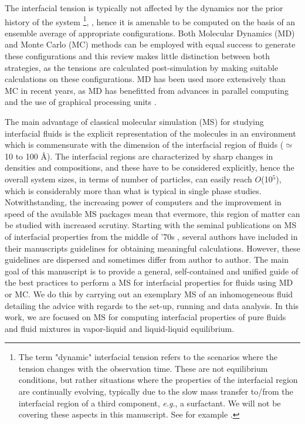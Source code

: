 \documentclass[9pt,bestpractices]{livecoms}
\begin{document}
The interfacial tension is typically not affected by the dynamics nor the prior
history of the system \footnote{The term "dynamic" interfacial tension
refers to the scenarios where the tension changes with the observation time.
These are not equilibrium conditions, but rather situations where the
properties of the interfacial region are continually evolving, typically due to
the slow mass transfer to/from the interfacial region of a third component,
\textit{e.g}., a surfactant. We will not be covering these aspects in this
manuscript. See for example \citet{dukhin1995}.}, \citep{rowlinson1982}, hence it is amenable to be computed on
the basis of an ensemble average of appropriate configurations. Both Molecular
Dynamics (MD) \citep{allen2017} and Monte Carlo (MC) \citep{frenkel2002} methods can be employed
with equal success to generate these configurations and this review makes
little distinction between both strategies, as the tensions are calculated
post-simulation by making suitable calculations on these configurations. MD has
been used more extensively than MC in recent years, as MD has benefitted from
advances in parallel computing and the use of graphical processing units \citep{faraday2014}.

The main advantage of classical molecular simulation (MS) for studying
interfacial fluids is the explicit representation of the molecules in an
environment which is commensurate with the dimension of the interfacial region
of fluids (${\simeq}$ 10 to 100 \AA{}). The interfacial regions are
characterized by sharp changes in densities and compositions, and these have to
be considered explicitly, hence the overall system sizes, in terms of number of
particles, can easily reach $O$(10$^{5}$), which is considerably more
than what is typical in single phase studies. Notwithstanding, the increasing
power of computers and the improvement in speed of the available MS packages
mean that evermore, this region of matter can be studied with increased
scrutiny. Starting with the seminal publications on MS of interfacial
properties from the middle of '70s \citep{liu1974}, several
authors have included in their manuscripts guidelines for obtaining meaningful
calculations. However, these guidelines are dispersed and sometimes differ from
author to author. The main goal of this manuscript is to provide a general,
self-contained and unified guide of the best practices to perform a MS for
interfacial properties for fluids using MD or MC. We do this by carrying out an
exemplary MS of an inhomogeneous fluid detailing the advice with regards to the
set-up, running and data analysis. In this work, we are focused on MS for
computing interfacial properties of pure fluids and fluid mixtures in
vapor-liquid and liquid-liquid equilibrium. 
\end{document}
